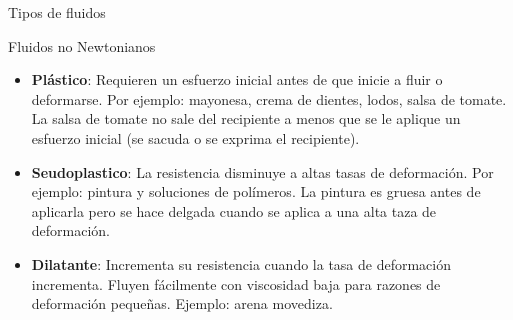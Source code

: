 \documentclass [xcolor=svgnames, t] {beamer}
\begin{document}
\begin{frame}{Tipos de fluidos} 
\begin{block}{Fluidos no Newtonianos} 
\begin{itemize}
\item \textbf{Pl\'astico}: Requieren un esfuerzo inicial antes de que inicie a fluir o deformarse. Por ejemplo: mayonesa, crema de dientes, lodos, salsa de tomate. La salsa de tomate no sale del recipiente a menos que se le aplique un esfuerzo inicial (se sacuda o se exprima el recipiente). 
\item \textbf{Seudoplastico}: La resistencia disminuye a altas tasas de deformaci\'on. Por ejemplo: pintura y soluciones de pol\'imeros. La pintura es gruesa antes de aplicarla pero se hace delgada cuando se aplica a una alta taza de deformaci\'on.
\item \textbf{Dilatante}: Incrementa su resistencia cuando la tasa de deformaci\'on incrementa. Fluyen f\'acilmente con viscosidad baja para razones de deformaci\'on peque\~nas. Ejemplo: arena movediza. 
\end{itemize}
\end{block}
\end{frame}
\end{document}

